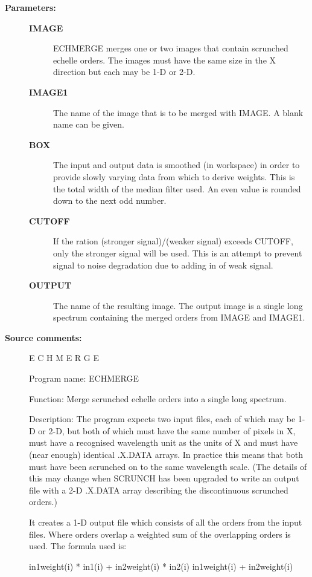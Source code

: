 \begin{description}
\begin{description}
\item [\textbf{Parameters:}]
\begin{description}
\item [\textbf{IMAGE}]
 ECHMERGE merges one or two images that contain scrunched
 echelle orders. The images must have the same size in the
 X direction but each may be 1-D or 2-D.
\item [\textbf{IMAGE1}]
 The name of the image that is to be merged with IMAGE.
 A blank name can be given.
\item [\textbf{BOX}]
 The input and output data is smoothed (in workspace) in
 order to provide slowly varying data from which to derive
 weights. This is the total width of the median filter used.
 An even value is rounded down to the next odd number.
\item [\textbf{CUTOFF}]
 If the ration (stronger signal)/(weaker signal) exceeds
 CUTOFF, only the stronger signal will be used. This is
 an attempt to prevent signal to noise degradation due to
 adding in of weak signal.
\item [\textbf{OUTPUT}]
 The name of the resulting image. The output image is a
 single long spectrum containing the merged orders from
 IMAGE and IMAGE1.
\end{description}

\item [\textbf{Source comments:}]
\begin{terminalv}
 E C H M E R G E

 Program name:
    ECHMERGE

 Function:
    Merge scrunched echelle orders into a single long spectrum.

 Description:
    The program expects two input files, each of which may be 1-D or
    2-D, but both of which must have the same number of pixels in X,
    must have a recognised wavelength unit as the units of X and must
    have (near enough) identical .X.DATA arrays. In practice this
    means that both must have been scrunched on to the same wavelength
    scale. (The details of this may change when SCRUNCH has been
    upgraded to write an output file with a 2-D .X.DATA array
    describing the discontinuous scrunched orders.)

    It creates a 1-D output file which consists of all the orders from
    the input files. Where orders overlap a weighted sum of the
    overlapping orders is used. The formula used is:

                   in1weight(i) * in1(i) + in2weight(i) * in2(i)
                            in1weight(i) + in2weight(i)


\end{terminalv}
\end{description}
\end{description}
